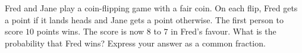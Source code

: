 Fred and Jane play a coin-flipping game with a fair coin. On each flip, Fred gets a point if it lands heads and Jane gets a point otherwise. The first person to score $10$ points wins. The score is now $8$ to $7$ in Fred's favour. What is the probability that Fred wins? Express your answer as a common fraction.
